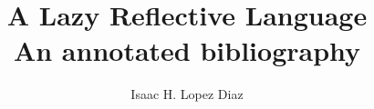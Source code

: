 \documentclass{article}
\title{A Lazy Reflective Language \\ An annotated bibliography}
\author{Isaac H. Lopez Diaz}
\begin{document}
\maketitle
\nocite*{}


\end{document}
